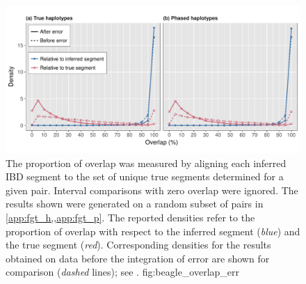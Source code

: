 

\begin{figure}[!htb]
\includegraphics[width=\textwidth]{./img/ch4/beagle_overlap_err}
{The proportion of overlap was measured by aligning each inferred IBD segment to the set of unique true segments determined for a given pair.
Interval comparisons with zero overlap were ignored.
The results shown were generated on a random subset of  pairs in \cref{app:fgt_h,,app:fgt_p}.
The reported densities refer to the proportion of overlap with respect to the inferred segment (\emph{blue}) and the true segment (\emph{red}).
Corresponding densities for the results obtained on data before the integration of error are shown for comparison (\emph{dashed} lines); see .}
{fig:beagle_overlap_err}
\end{figure}
